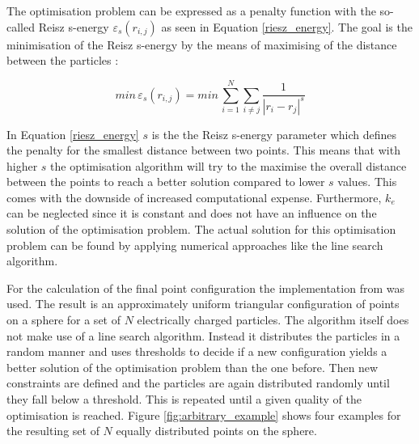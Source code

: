 The optimisation problem can be expressed as a penalty function with the so-called Reisz s-energy $\varepsilon_s (r_{i,j})$ as seen in Equation \ref{riesz_energy}. The goal is the minimisation of the Reisz s-energy by the means of maximising of the distance between the particles \cite{EtayoMinimizinSpehres}:

\begin{equation}
min\, \varepsilon_s (r_{i,j}) = min\, \sum_{i = 1}^{N}\sum_{i \neq j}^{}\frac{1}{{|r_{i}-r_{j}|}^s}
\label{riesz_energy}
\end{equation}

In Equation \ref{riesz_energy} $s$ is the the Reisz s-energy parameter which defines the penalty for the smallest distance between two points. This means that with higher $s$ the optimisation algorithm will try to the maximise the overall distance between the points to reach a better solution compared to lower $s$ values. This comes with the downside of increased computational expense. Furthermore, $k_e$ can be neglected since it is constant and does not have an influence on the solution of the optimisation problem. The actual solution for this optimisation problem can be found by applying numerical approaches like the line search algorithm.

\medskip

For the calculation of the final point configuration the implementation from \cite{AntonSemechkoSuiteSphere} was used. The result is an approximately uniform triangular configuration of points on a sphere for a set of $N$ electrically charged particles. The algorithm itself does not make use of a line search algorithm. Instead it distributes the particles in a random manner and uses thresholds to decide if a new configuration yields a better solution of the optimisation problem than the one before. Then new constraints are defined and the particles are again distributed randomly until they fall below a threshold. This is repeated until a given quality of the optimisation is reached. Figure \ref{fig:arbitrary_example} shows four examples for the resulting set of $N$ equally distributed points on the sphere.

